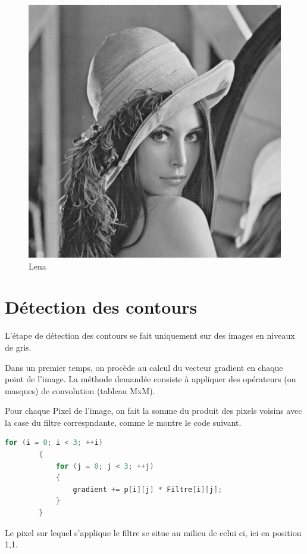 \documentclass[11pt]{article}
\begin{document}
	\begin{figure}[H]
		\centering
		\includegraphics[scale=0.20]{Image/lena.png}
		\caption{Lena}
		\label{fig:Lena}
	\end{figure}

\section{Détection des contours}
	
	L'étape de détection des contours se fait uniquement sur des images en niveaux de gris.

	Dans un premier temps, on procède au calcul du vecteur gradient en chaque point de l'image.
	La méthode demandée consiste à appliquer des opérateurs (ou masques) de convolution (tableau MxM).

	Pour chaque Pixel de l'image, on fait la somme du produit des pixels voisins avec la case du filtre correspndante, comme le montre le code suivant.

	\begin{lstlisting}[caption={filtre.h},language=C++,label=filtreh]
		for (i = 0; i < 3; ++i)
		{
			for (j = 0; j < 3; ++j)
			{ 
				gradient += p[i][j] * Filtre[i][j];	
			}
		}
	\end{lstlisting}
	Le pixel sur lequel s'applique le filtre se situe au milieu de celui ci, ici en position 1,1.
\end{document}
